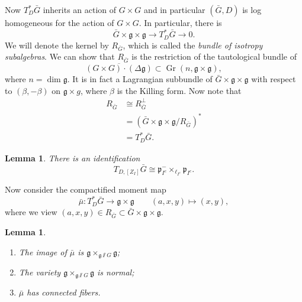 \documentclass{amsart}
\newtheorem{lem}[thm]{Lemma}
\theoremstyle{definition}
\theoremstyle{remark}
\theoremstyle{plain}
\theoremstyle{definition}
\theoremstyle{remark}
\newcommand{\g}{\mathfrak{g}}
\newcommand{\mf}[1]{\mathfrak{#1}}
\newcommand{\on}[1]{\operatorname{#1}}
\newcommand{\ol}[1]{\overline{#1}}
\newcommand{\1}{\mathbf{1}}
\newcommand{\2}{\mathbf{2}}
\newcommand{\3}{\mathbf{3}}
\begin{document}
Now \(T_D^* \bar{G}\) inherits an action of \(G \times G\) and in particular \((\bar{G}, D)\) is log homogeneous for the action of \(G \times G\). In particular, there is
\[ \bar{G} \times \g \times \g \to T_D^* \bar{G} \to 0. \]
We will denote the kernel by \(R_{\bar{G}}\), which is called the \textit{bundle of isotropy subalgebras}. We can show that \(R_{\bar{G}}\) is the restriction of the tautological bundle of
\[ \ol{(G \times G) \cdot (\Delta \g)} \subset \on{Gr}(n, \g \times \g), \]
where \(n = \dim \g\). It is in fact a Lagrangian subbundle of \(\bar{G} \times \g \times \g\) with respect to \((\beta, -\beta)\) on \(\g \times g\), where \(\beta\) is the Killing form. Now note that
\begin{align*}
    R_{\bar{G}} &\cong R_{\bar{G}}^{\perp} \\
    &= (\bar{G} \times \g \times \g / R_{\bar{G}})^* \\
    &= T_D^* \bar{G}.
\end{align*}

\begin{lem}
    There is an identification
    \[ T_{D, [Z_I]} \bar{G} \cong \mf{p}_{I^c}^- \times_{\ell_{I^c}} \mf{p}_{I^c}. \]
\end{lem}

Now consider the compactified moment map
\[ \bar{\mu} \colon T_D^* \bar{G} \to \g \times \g \qquad (a,x,y) \mapsto (x,y), \]
where we view \((a,x,y) \in R_{\bar{G}} \subset \bar{G} \times \g \times \g\). 

\begin{lem}\leavevmode
    \begin{enumerate}
        \item The image of \(\bar{\mu}\) is \(\g \times_{\g \sslash G} \g\);
        \item The variety \(\g \times_{\g \sslash G} \g\) is normal;
        \item \(\bar{\mu}\) has connected fibers.
    \end{enumerate}
\end{lem}
\end{document}
